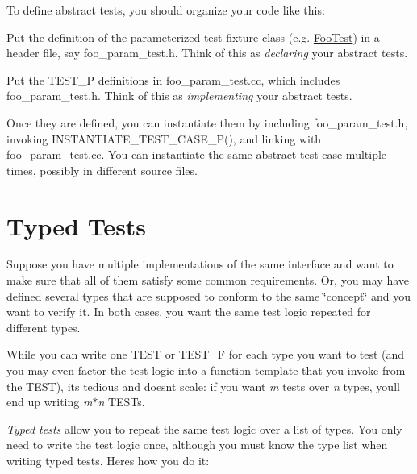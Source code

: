 To define abstract tests, you should organize your code like this\+:


\begin{DoxyEnumerate}
\item Put the definition of the parameterized test fixture class (e.\+g. {\ttfamily \mbox{\hyperlink{class_foo_test}{Foo\+Test}}}) in a header file, say {\ttfamily foo\+\_\+param\+\_\+test.\+h}. Think of this as {\itshape declaring} your abstract tests.
\end{DoxyEnumerate}
\begin{DoxyEnumerate}
\item Put the {\ttfamily T\+E\+S\+T\+\_\+P} definitions in {\ttfamily foo\+\_\+param\+\_\+test.\+cc}, which includes {\ttfamily foo\+\_\+param\+\_\+test.\+h}. Think of this as {\itshape implementing} your abstract tests.
\end{DoxyEnumerate}

Once they are defined, you can instantiate them by including {\ttfamily foo\+\_\+param\+\_\+test.\+h}, invoking {\ttfamily I\+N\+S\+T\+A\+N\+T\+I\+A\+T\+E\+\_\+\+T\+E\+S\+T\+\_\+\+C\+A\+S\+E\+\_\+\+P()}, and linking with {\ttfamily foo\+\_\+param\+\_\+test.\+cc}. You can instantiate the same abstract test case multiple times, possibly in different source files.

\section*{Typed Tests}

Suppose you have multiple implementations of the same interface and want to make sure that all of them satisfy some common requirements. Or, you may have defined several types that are supposed to conform to the same \char`\"{}concept\char`\"{} and you want to verify it. In both cases, you want the same test logic repeated for different types.

While you can write one {\ttfamily T\+E\+ST} or {\ttfamily T\+E\+S\+T\+\_\+F} for each type you want to test (and you may even factor the test logic into a function template that you invoke from the {\ttfamily T\+E\+ST}), it\textquotesingle{}s tedious and doesn\textquotesingle{}t scale\+: if you want {\itshape m} tests over {\itshape n} types, you\textquotesingle{}ll end up writing {\itshape m$\ast$n} {\ttfamily T\+E\+ST}s.

{\itshape Typed tests} allow you to repeat the same test logic over a list of types. You only need to write the test logic once, although you must know the type list when writing typed tests. Here\textquotesingle{}s how you do it\+:

